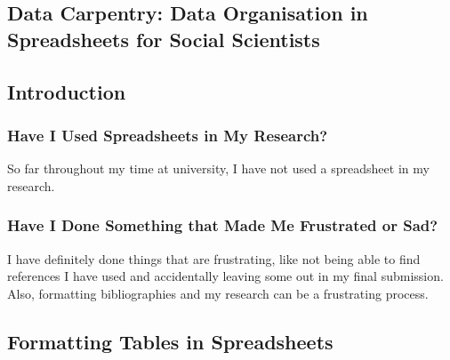\documentclass{article}
\begin{document}
\begin{FlushLeft}
\pagebreak

\section{Data Carpentry: Data Organisation in Spreadsheets for Social Scientists}

\subsection{Introduction}
\subsubsection*{Have I Used Spreadsheets in My Research?}
So far throughout my time at university, I have not used a spreadsheet in my research.
\subsubsection*{Have I Done Something that Made Me Frustrated or Sad?}
I have definitely done things that are frustrating, like not being able to find references I have used and accidentally leaving some out in my final submission. Also, formatting bibliographies and my research can be a frustrating process.

\subsection{Formatting Tables in Spreadsheets}

\end{FlushLeft}
\end{document}
